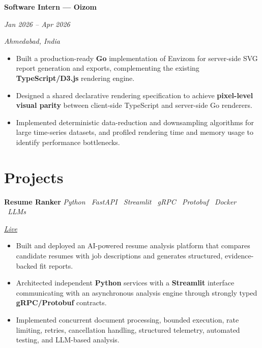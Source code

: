 \documentclass[10pt,a4paper]{article}
\newcommand{\datedentry}[2]{%
    \noindent
    \begin{minipage}[t]{0.72\linewidth}
        \raggedright
        \textbf{#1}
    \end{minipage}%
    \hfill
    \begin{minipage}[t]{0.25\linewidth}
        \raggedleft
        \textit{\color{textgray}#2}
    \end{minipage}%
    \par
}
\newcommand{\projectentry}[3]{%
    \noindent
    \begin{minipage}[t]{0.62\linewidth}
        \raggedright
        \textbf{#1}
        \hspace{0.7em}
        \textit{\color{textgray}#2}
    \end{minipage}%
    \hfill
    \begin{minipage}[t]{0.34\linewidth}
        \raggedleft
        \itshape\color{textgray}#3
    \end{minipage}%
    \par
}
\begin{document}
\datedentry
    {Software Intern --- Oizom}
    {Jan 2026 -- Apr 2026}

\vspace{1.5pt}

{\fontsize{10}{12}\selectfont
\itshape\color{textgray}
Ahmedabad, India
}

\vspace{2pt}

\begin{itemize}
    \item Built a production-ready \textbf{Go} implementation of Envizom for server-side SVG report generation and exports, complementing the existing \textbf{TypeScript/D3.js} rendering engine.

    \item Designed a shared declarative rendering specification to achieve \textbf{pixel-level visual parity} between client-side TypeScript and server-side Go renderers.

    \item Implemented deterministic data-reduction and downsampling algorithms for large time-series datasets, and profiled rendering time and memory usage to identify performance bottlenecks.
\end{itemize}

\section*{Projects}

\projectentry
    {Resume Ranker}
    {Python \textperiodcentered\ FastAPI \textperiodcentered\ Streamlit \textperiodcentered\ gRPC \textperiodcentered\ Protobuf \textperiodcentered\ Docker \textperiodcentered\ LLMs}
    {\href{https://resumeranker.kishanthanki.space/}{Live}}

\vspace{2pt}

\begin{itemize}
    \item Built and deployed an AI-powered resume analysis platform that compares candidate resumes with job descriptions and generates structured, evidence-backed fit reports.

    \item Architected independent \textbf{Python} services with a \textbf{Streamlit} interface communicating with an asynchronous analysis engine through strongly typed \textbf{gRPC/Protobuf} contracts.

    \item Implemented concurrent document processing, bounded execution, rate limiting, retries, cancellation handling, structured telemetry, automated testing, and LLM-based analysis.
\end{itemize}
\end{document}
